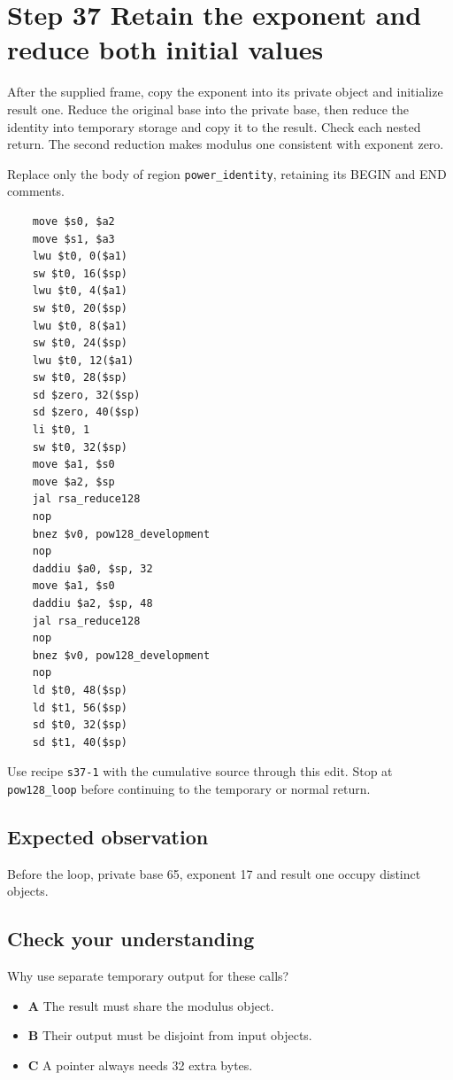 \section{Step 37 Retain the exponent and reduce both initial values}\label{rsa-s37}

After the supplied frame, copy the exponent into its private object and initialize result one. Reduce the original base into the private base, then reduce the identity into temporary storage and copy it to the result. Check each nested return. The second reduction makes modulus one consistent with exponent zero.

Replace only the body of region \texttt{power\_identity}, retaining its BEGIN and END comments.

\begin{verbatim}
    move $s0, $a2
    move $s1, $a3
    lwu $t0, 0($a1)
    sw $t0, 16($sp)
    lwu $t0, 4($a1)
    sw $t0, 20($sp)
    lwu $t0, 8($a1)
    sw $t0, 24($sp)
    lwu $t0, 12($a1)
    sw $t0, 28($sp)
    sd $zero, 32($sp)
    sd $zero, 40($sp)
    li $t0, 1
    sw $t0, 32($sp)
    move $a1, $s0
    move $a2, $sp
    jal rsa_reduce128
    nop
    bnez $v0, pow128_development
    nop
    daddiu $a0, $sp, 32
    move $a1, $s0
    daddiu $a2, $sp, 48
    jal rsa_reduce128
    nop
    bnez $v0, pow128_development
    nop
    ld $t0, 48($sp)
    ld $t1, 56($sp)
    sd $t0, 32($sp)
    sd $t1, 40($sp)
\end{verbatim}

Use recipe \texttt{s37-1} with the cumulative source through this edit. Stop at \texttt{pow128\_loop} before continuing to the temporary or normal return.

\subsection{Expected observation}
Before the loop, private base 65, exponent 17 and result one occupy distinct objects.

\subsection{Check your understanding}
Why use separate temporary output for these calls?

\begin{itemize}
  \item \textbf{A} The result must share the modulus object.
  \item \textbf{B} Their output must be disjoint from input objects.
  \item \textbf{C} A pointer always needs 32 extra bytes.
\end{itemize}
